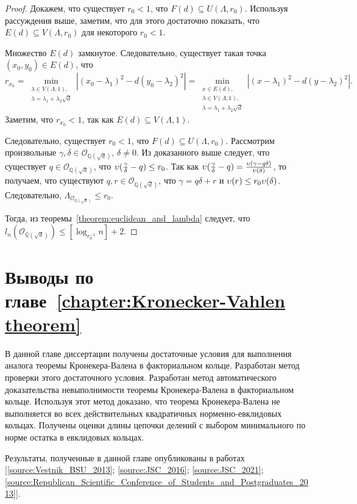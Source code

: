 \documentclass[_00_dissertation.tex]{subfiles}
\begin{document}
\begin{proof}
    Докажем, что существует $r_0 < 1$, что $F(d) \subseteq U(\Lambda, r_0)$.
    Используя рассуждения выше, заметим, что для этого достаточно показать, что $E(d) \subseteq V(\Lambda, r_0)$ для некоторого $r_0 < 1$.
    
    Множество $E(d)$ замкнутое.
    Следовательно, существует такая точка $(x_0, y_0) \in E(d)$, что
    \begin{equation*}
        r_{x_0} = \min_{\substack{
            \lambda \in V(\Lambda, 1),\\
            \lambda = \lambda_1 + \lambda_2 \sqrt{d}
        }} \left|
            (x_0 - \lambda_1)^2 - d(y_0 - \lambda_2)^2
        \right| = \min_{\substack{
            x \in E(d),\\
            \lambda \in V(\Lambda, 1),\\
            \lambda = \lambda_1 + \lambda_2 \sqrt{d}
        }} \left|
            (x - \lambda_1)^2 - d(y - \lambda_2)^2
        \right|.
    \end{equation*}
    Заметим, что $r_{x_0} < 1$, так как $E(d) \subseteq V(\Lambda, 1)$.

    Следовательно, существует $r_0 < 1$, что $F(d) \subseteq U(\Lambda, r_0)$.
    Рассмотрим произвольные $\gamma, \delta \in \mathcal{O}_{\mathbb{Q}(\sqrt{d})}$, $\delta \neq 0$.
    Из доказанного выше следует, что существует $q \in \mathcal{O}_{\mathbb{Q}(\sqrt{d})}$, что $\upsilon(\frac{\gamma}{\delta} - q) \le r_0$.
    Так как $\upsilon(\frac{\gamma}{\delta} - q) = \frac{\upsilon(\gamma - q\delta)}{\upsilon(\delta)}$, то получаем, что существуют $q, r \in \mathcal{O}_{\mathbb{Q}(\sqrt{d})}$, что $\gamma = q\delta + r$ и $\upsilon(r) \le r_0 \upsilon(\delta)$.
    Следовательно, $\Lambda_{\mathcal{O}_{\mathbb{Q}(\sqrt{d})}} \le r_0$.

    Тогда, из теоремы~\ref{theorem:euclidean_and_lambda} следует, что $l_n(\mathcal{O}_{\mathbb{Q}(\sqrt{d})}) \le [\log_{r_0^{-1}} n] + 2$.
\end{proof}

\section*{Выводы по главе~\ref{chapter:Kronecker-Vahlen theorem}}

В данной главе диссертации получены достаточные условия для выполнения аналога теоремы Кронекера-Валена в факториальном кольце.
Разработан метод проверки этого достаточного условия.
Разработан метод автоматического доказательства невыполнимости теоремы Кронекера-Валена в факториальном кольце.
Используя этот метод доказано, что теорема Кронекера-Валена не выполняется во всех действительных квадратичных норменно-евклидовых кольцах.
Получены оценки длины цепочки делений с выбором минимального по норме остатка в евклидовых кольцах.

Результаты, полученные в данной главе опубликованы в работах [\ref{source:Vestnik_BSU_2013}; \ref{source:JSC_2016}; \ref{source:JSC_2021}; \ref{source:Republican_Scientific_Conference_of_Students_and_Postgraduates_2013}].

\onlyinsubfile{
    
}
\end{document}
